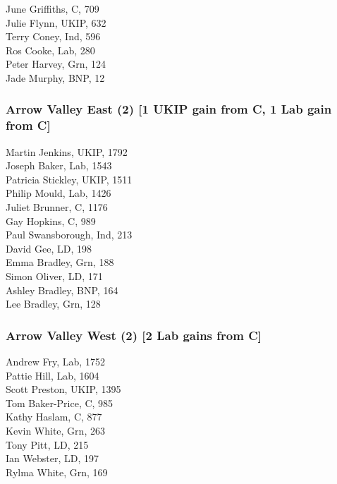 \documentclass[a4paper,openany,10pt]{book}
\begin{document}


June Griffiths, C, 709\\
Julie Flynn, UKIP, 632\\
Terry Coney, Ind, 596\\
Ros Cooke, Lab, 280\\
Peter Harvey, Grn, 124\\
Jade Murphy, BNP, 12\\


\subsubsection*{Arrow Valley East (2) \hspace*{\fill}\nolinebreak[1]%
\enspace\hspace*{\fill}
[1 UKIP gain from C, 1 Lab gain from C]}



Martin Jenkins, UKIP, 1792\\
Joseph Baker, Lab, 1543\\
Patricia Stickley, UKIP, 1511\\
Philip Mould, Lab, 1426\\
Juliet Brunner, C, 1176\\
Gay Hopkins, C, 989\\
Paul Swansborough, Ind, 213\\
David Gee, LD, 198\\
Emma Bradley, Grn, 188\\
Simon Oliver, LD, 171\\
Ashley Bradley, BNP, 164\\
Lee Bradley, Grn, 128\\


\subsubsection*{Arrow Valley West (2) \hspace*{\fill}\nolinebreak[1]%
\enspace\hspace*{\fill}
[2 Lab gains from C]}



Andrew Fry, Lab, 1752\\
Pattie Hill, Lab, 1604\\
Scott Preston, UKIP, 1395\\
Tom Baker-Price, C, 985\\
Kathy Haslam, C, 877\\
Kevin White, Grn, 263\\
Tony Pitt, LD, 215\\
Ian Webster, LD, 197\\
Rylma White, Grn, 169\\
\end{document}
